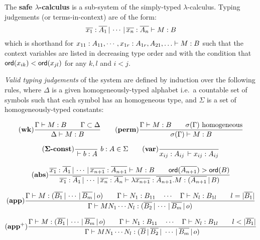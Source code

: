 The \textbf{safe $\lambda$-calculus} is a sub-system of the
simply-typed $\lambda$-calculus. Typing judgements (or
terms-in-context) are of the form:
\begin{equation}
\nonumber {{\overline{x_1}:\overline{A_1} \, | \, \cdots \, | \,
\overline{x_n} :  \overline{A_n}} \vdash {M : B}}
\end{equation}
which is shorthand for ${{x_{11} : A_{11}, \cdots, x_{1r}:
A_{1r}, A_{21},\ldots } \vdash {M : B}}$ such that the context variables are listed in decreasing type order and
 with the condition that ${\sf ord}(x_{ik}) < {\sf ord}(x_{jl})$ for any $k, l$ and $i<j$.

\emph{Valid typing judgements} of the system are defined by
induction over the following rules, where $\Delta$ is a given
homogeneously-typed alphabet i.e.\ a countable set of symbols such that each
symbol has an homogeneous type, and $\Sigma$ is a set of homogeneously-typed
constants:

$$ \mathbf{(wk)}
    {   \frac{\displaystyle  {{\Gamma} \vdash {M:B}} \qquad {\Gamma \subset \Delta} }{ {{\Delta } \vdash {M : B}}}
   }
\qquad
    \mathbf{(perm)}
    {
      \frac{\displaystyle  {{\Gamma} \vdash {M:B}} \qquad \sigma(\Gamma) \hbox{ homogeneous} }{ {{\sigma(\Gamma)} \vdash {M : B}} }
    }
$$

$$ \mathbf{(\Sigma\mbox{\textbf{-const}})}  \frac{\displaystyle }{{{} \vdash {b : A}}}\ b:A \in \Sigma
\qquad
 \mathbf{(var)} \frac{\displaystyle }{{{x_{ij} : A_{ij}\, } \vdash {x_{ij} : A_{ij}}}}
$$

$$\mathbf{(abs)}
\frac{\displaystyle 
 {{{\overline{x_1} : \overline{A_1}\, | \, \cdots\, | \, \overline{x_{n+1}} : \overline{A_{n+1}}} \vdash {M : B}}}            \qquad {\sf ord}(\overline{A_{n+1}}) > {\sf ord}(B)
 }{ {{\overline{x_1} : \overline{A_1}\, | \, \cdots\, | \, \overline{x_{n}} : \overline{A_{n}}} \vdash { \lambda \overline{x_{n+1}} : \overline{A_{n+1}} .M : (\overline{A_{n+1}} \, | \, B)  }}
 }
$$

$$ \mathbf{(app)} \frac{\displaystyle {{{\Gamma} \vdash {M : (\overline{B_1} \, | \, \cdots \, | \, \overline{B_m} \, | \, o)}} \qquad
{{\Gamma} \vdash {N_1 : B_{11}}} \quad \cdots \quad {{\Gamma} \vdash {N_{l} :
B_{1l}}} \qquad l = |\overline{B_1}| }}{ {{\Gamma} \vdash {M N_1
\cdots N_{l} : (\overline{B_2} \, | \, \cdots \, | \,
\overline{B_m} \, | \, o)}}} $$

$$ \mathbf{(app^+)} \frac{\displaystyle {{\Gamma} \vdash {M : (\overline{B_1} \, | \, \cdots \, | \, \overline{B_m} \, | \, o)}} \qquad
    {{\Gamma} \vdash {N_1 : B_{11}}} \quad \cdots \quad {{\Gamma} \vdash {N_{l} :
    B_{1l}}} \qquad l < |\overline{B_1}| }{ {{\Gamma} \vdash {M N_1
    \cdots N_{l} : (\overline{B} \, | \, \overline{B_2} \, | \ \cdots \, | \,
    \overline{B_m} \, | \, o)}}} $$

